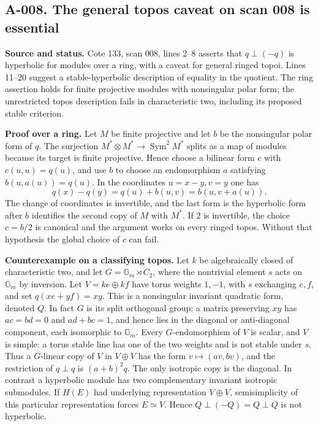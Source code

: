 \subsection*{A-008. The general topos caveat on scan 008 is essential}
\textbf{Source and status.} Cote 133, scan 008, lines 2--8 asserts that
$q\perp(-q)$ is hyperbolic for modules over a ring, with a caveat for
general ringed topoi.  Lines 11--20 suggest a stable-hyperbolic
description of equality in the quotient.  The ring assertion holds for
finite projective modules with nonsingular polar form; the unrestricted
topos description fails in characteristic two, including its proposed
stable criterion.

\textbf{Proof over a ring.} Let $M$ be finite projective and let $b$ be
the nonsingular polar form of $q$.  The surjection
$M^*\otimes M^*\longrightarrow\operatorname{Sym}^2M^*$ splits as a
map of modules because its target is finite projective.  Hence choose
a bilinear form $c$ with $c(u,u)=q(u)$, and use $b$ to choose an
endomorphism $a$ satisfying $b(u,a(u))=q(u)$.  In the coordinates
$u=x-y,v=y$ one has
\[
 q(x)-q(y)=q(u)+b(u,v)=b(u,v+a(u)).
\]
The change of coordinates is invertible, and the last form is the
hyperbolic form after $b$ identifies the second copy of $M$ with $M^*$.
If $2$ is invertible, the choice $c=b/2$ is canonical and the argument
works on every ringed topos.  Without that hypothesis the global choice
of $c$ can fail. 

\textbf{Counterexample on a classifying topos.}
Let $k$ be algebraically closed of characteristic two, and let
$G=\mathbb G_m\rtimes C_2$, where the nontrivial element $s$ acts on
$\mathbb G_m$ by inversion.  Let $V=ke\oplus kf$ have torus weights
$1,-1$, with $s$ exchanging $e,f$, and set $q(xe+yf)=xy$.
This is a nonsingular invariant quadratic form, denoted $Q$.
In fact $G$ is its split orthogonal group: a matrix preserving $xy$
has $ac=bd=0$ and $ad+bc=1$, and hence lies in the diagonal or
anti-diagonal component, each isomorphic to $\mathbb G_m$.
Every $G$-endomorphism of $V$ is scalar, and $V$ is simple: a torus
stable line has one of the two weights and is not stable under $s$.
Thus a $G$-linear copy of $V$ in $V\oplus V$ has the form
$v\mapsto(av,bv)$, and the restriction of $q\perp q$ is
$(a+b)^2q$.  The only isotropic copy is the diagonal.  In contrast a
hyperbolic module has two complementary invariant isotropic submodules.
If $H(E)$ had underlying representation $V\oplus V$, semisimplicity
of this particular representation forces $E\simeq V$.  Hence
$Q\perp(-Q)=Q\perp Q$ is not hyperbolic.


